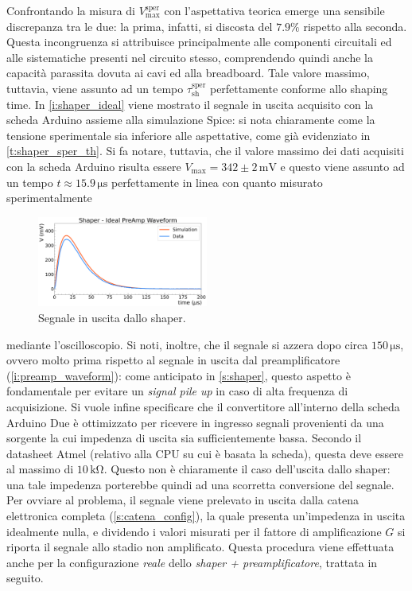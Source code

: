 \documentclass[a4paper,11pt]{article} %
\begin{document}
Confrontando la misura di $V_{\text{max}}^{\text{sper}}$ con l'aspettativa teorica emerge una sensibile discrepanza tra
le due: la prima, infatti, si discosta del $7.9\%$ rispetto alla seconda. Questa incongruenza si attribuisce
principalmente alle componenti circuitali ed alle sistematiche presenti nel circuito stesso, comprendendo quindi anche
la capacità parassita dovuta ai cavi ed alla breadboard. Tale valore massimo, tuttavia, viene assunto ad un tempo
$\tau_{\text{sh}}^{\text{sper}}$ perfettamente conforme allo shaping time. In \autoref{i:shaper_ideal} viene
mostrato il segnale in uscita acquisito con la scheda Arduino assieme alla simulazione Spice: si nota chiaramente come
la tensione sperimentale sia inferiore alle aspettative, come già evidenziato in \autoref{t:shaper_sper_th}. Si fa
notare, tuttavia, che il valore massimo dei dati acquisiti con la scheda Arduino risulta essere $V_{\text{max}} = 342
\pm 2 \,\si{\milli\volt}$ e questo viene assunto ad un tempo $t \approx 15.9\,\si{\us}$ perfettamente in linea con
quanto misurato sperimentalmente

\begin{figure} 
	\centering 
	\includegraphics[width=0.5\textwidth]{../Plots/Shaper/shaper_ideal.png}
	\vspace{-20pt}
   \caption{\small Segnale in uscita dallo shaper.} 
   \label{i:shaper_ideal} 
\end{figure}

mediante l'oscilloscopio. Si noti, inoltre, che il segnale si azzera dopo circa $150\,\si{\us}$, ovvero molto prima
rispetto al segnale in uscita dal preamplificatore (\autoref{i:preamp_waveform}): come anticipato in \autoref{s:shaper},
questo aspetto è fondamentale per evitare un \textit{signal pile up} in caso di alta frequenza di acquisizione. Si vuole
infine specificare che il convertitore all'interno della scheda Arduino Due è ottimizzato per ricevere in ingresso
segnali provenienti da una sorgente la cui impedenza di uscita sia sufficientemente bassa. Secondo il datasheet Atmel
(relativo alla CPU su cui è basata la scheda), questa deve essere al massimo di $10\,\si{\kilo\ohm}$.%
Questo non è chiaramente il caso dell'uscita dallo shaper: una tale
impedenza porterebbe quindi ad una scorretta conversione del segnale. Per ovviare al problema, il segnale viene
prelevato in uscita dalla catena elettronica completa (\autoref{s:catena_config}), la quale presenta
un'impedenza in uscita idealmente nulla, e dividendo i valori misurati per il fattore di amplificazione $G$ si riporta
il segnale allo stadio non amplificato. Questa procedura viene effettuata anche per la configurazione \textit{reale}
dello \textit{shaper + preamplificatore}, trattata in seguito.
\end{document}

